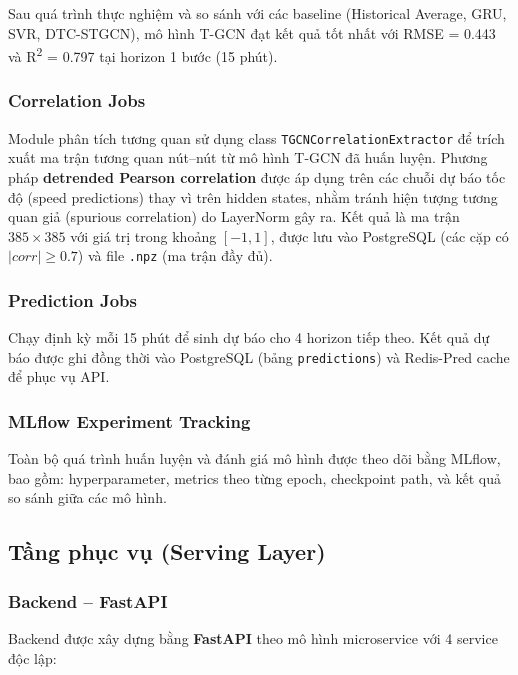Sau quá trình thực nghiệm và so sánh với các baseline (Historical Average, GRU, SVR, DTC-STGCN), mô hình T-GCN đạt kết quả tốt nhất với RMSE = 0.443 và R\textsuperscript{2} = 0.797 tại horizon 1 bước (15 phút).

\subsubsection{Correlation Jobs}
Module phân tích tương quan sử dụng class \texttt{TGCNCorrelationExtractor} để trích xuất ma trận tương quan nút--nút từ mô hình T-GCN đã huấn luyện. Phương pháp \textbf{detrended Pearson correlation} được áp dụng trên các chuỗi dự báo tốc độ (speed predictions) thay vì trên hidden states, nhằm tránh hiện tượng tương quan giả (spurious correlation) do LayerNorm gây ra. Kết quả là ma trận $385 \times 385$ với giá trị trong khoảng $[-1, 1]$, được lưu vào PostgreSQL (các cặp có $|corr| \geq 0.7$) và file \texttt{.npz} (ma trận đầy đủ).

\subsubsection{Prediction Jobs}
Chạy định kỳ mỗi 15 phút để sinh dự báo cho 4 horizon tiếp theo. Kết quả dự báo được ghi đồng thời vào PostgreSQL (bảng \texttt{predictions}) và Redis-Pred cache để phục vụ API.

\subsubsection{MLflow Experiment Tracking}
Toàn bộ quá trình huấn luyện và đánh giá mô hình được theo dõi bằng MLflow, bao gồm: hyperparameter, metrics theo từng epoch, checkpoint path, và kết quả so sánh giữa các mô hình.

\subsection{Tầng phục vụ (Serving Layer)}

\subsubsection{Backend -- FastAPI}
Backend được xây dựng bằng \textbf{FastAPI} theo mô hình microservice với 4 service độc lập:

